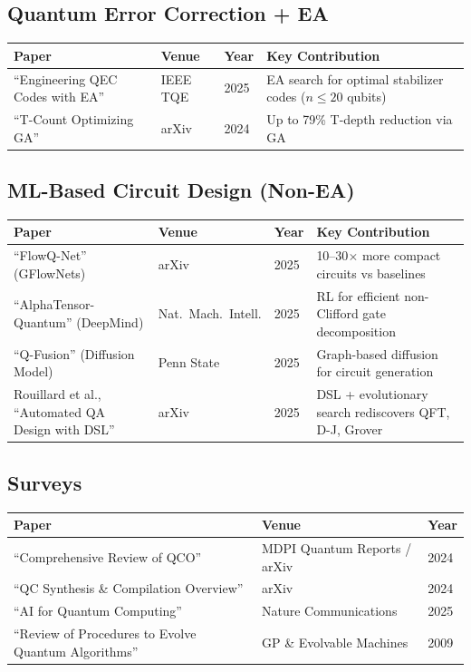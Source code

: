 \documentclass[11pt]{article}
\begin{document}
\subsection{Quantum Error Correction + EA}

\begin{longtable}{p{5.5cm} p{3cm} p{1cm} p{4.5cm}}
\toprule
\textbf{Paper} & \textbf{Venue} & \textbf{Year} & \textbf{Key Contribution} \\
\midrule
\endhead
``Engineering QEC Codes with EA'' \cite{qecea2025} & IEEE TQE & 2025 & EA search for optimal stabilizer codes ($n \le 20$ qubits) \\
\addlinespace
``T-Count Optimizing GA'' \cite{tcount2024} & arXiv & 2024 & Up to 79\% T-depth reduction via GA \\
\bottomrule
\end{longtable}

\subsection{ML-Based Circuit Design (Non-EA)}

\begin{longtable}{p{5.5cm} p{3cm} p{1cm} p{4.5cm}}
\toprule
\textbf{Paper} & \textbf{Venue} & \textbf{Year} & \textbf{Key Contribution} \\
\midrule
\endhead
``FlowQ-Net'' (GFlowNets) \cite{flowqnet2025} & arXiv & 2025 & 10--30$\times$ more compact circuits vs baselines \\
\addlinespace
``AlphaTensor-Quantum'' (DeepMind) \cite{alphatensor2025} & Nat.\ Mach.\ Intell. & 2025 & RL for efficient non-Clifford gate decomposition \\
\addlinespace
``Q-Fusion'' (Diffusion Model) \cite{qfusion2025} & Penn State & 2025 & Graph-based diffusion for circuit generation \\
\addlinespace
Rouillard et al., ``Automated QA Design with DSL'' \cite{rouillard2025} & arXiv & 2025 & DSL + evolutionary search rediscovers QFT, D-J, Grover \\
\bottomrule
\end{longtable}

\subsection{Surveys}

\begin{longtable}{p{7cm} p{4.5cm} p{1cm}}
\toprule
\textbf{Paper} & \textbf{Venue} & \textbf{Year} \\
\midrule
\endhead
``Comprehensive Review of QCO'' \cite{qcoreview2024} & MDPI Quantum Reports / arXiv & 2024 \\
\addlinespace
``QC Synthesis \& Compilation Overview'' \cite{qcsynthesis2024} & arXiv & 2024 \\
\addlinespace
``AI for Quantum Computing'' \cite{aiqc2025} & Nature Communications & 2025 \\
\addlinespace
``Review of Procedures to Evolve Quantum Algorithms'' \cite{evolveqa2009} & GP \& Evolvable Machines & 2009 \\
\bottomrule
\end{longtable}
\end{document}
